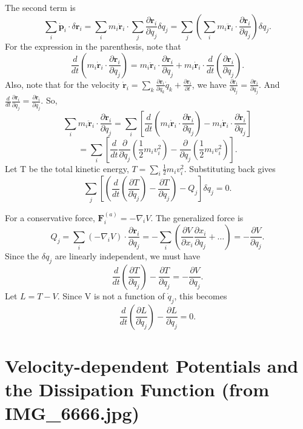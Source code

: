 \documentclass[12pt,a4paper]{article}
\theoremstyle{definition}
\theoremstyle{remark}
\renewcommand{\vec}[1]{\mathbf{#1}}
\begin{document}
	The second term is
	$$ \sum_i \dot{\vec{p}}_i \cdot \delta\vec{r}_i = \sum_i m_i \ddot{\vec{r}}_i \cdot \sum_j \frac{\partial \vec{r}_i}{\partial q_j} \delta q_j = \sum_j \left( \sum_i m_i \ddot{\vec{r}}_i \cdot \frac{\partial \vec{r}_i}{\partial q_j} \right) \delta q_j. $$
	For the expression in the parenthesis, note that
	$$ \frac{d}{dt} \left( m_i \dot{\vec{r}}_i \cdot \frac{\partial \vec{r}_i}{\partial q_j} \right) = m_i \ddot{\vec{r}}_i \cdot \frac{\partial \vec{r}_i}{\partial q_j} + m_i \dot{\vec{r}}_i \cdot \frac{d}{dt} \left( \frac{\partial \vec{r}_i}{\partial q_j} \right). $$
	Also, note that for the velocity $\dot{\vec{r}}_i = \sum_k \frac{\partial \vec{r}_i}{\partial q_k} \dot{q}_k + \frac{\partial \vec{r}_i}{\partial t}$, we have $\frac{\partial \dot{\vec{r}}_i}{\partial \dot{q}_j} = \frac{\partial \vec{r}_i}{\partial q_j}$. And $\frac{d}{dt} \frac{\partial \vec{r}_i}{\partial q_j} = \frac{\partial \dot{\vec{r}}_i}{\partial q_j}$.
	So,
	$$ \sum_i m_i \ddot{\vec{r}}_i \cdot \frac{\partial \vec{r}_i}{\partial q_j} = \sum_i \left[ \frac{d}{dt} \left( m_i \dot{\vec{r}}_i \cdot \frac{\partial \dot{\vec{r}}_i}{\partial \dot{q}_j} \right) - m_i \dot{\vec{r}}_i \cdot \frac{\partial \dot{\vec{r}}_i}{\partial q_j} \right] $$
	$$ = \sum_i \left[ \frac{d}{dt} \frac{\partial}{\partial \dot{q}_j} \left( \frac{1}{2} m_i v_i^2 \right) - \frac{\partial}{\partial q_j} \left( \frac{1}{2} m_i v_i^2 \right) \right]. $$
	Let T be the total kinetic energy, $T = \sum_i \frac{1}{2}m_i v_i^2$.
	Substituting back gives
	$$ \sum_j \left[ \left( \frac{d}{dt} \left( \frac{\partial T}{\partial \dot{q}_j} \right) - \frac{\partial T}{\partial q_j} \right) - Q_j \right] \delta q_j = 0. $$
	
	For a conservative force, $\vec{F}_i^{(a)} = -\nabla_i V$. The generalized force is
	$$ Q_j = \sum_i (-\nabla_i V) \cdot \frac{\partial \vec{r}_i}{\partial q_j} = -\sum_i \left( \frac{\partial V}{\partial x_i} \frac{\partial x_i}{\partial q_j} + \dots \right) = -\frac{\partial V}{\partial q_j}. $$
	Since the $\delta q_j$ are linearly independent, we must have
	$$ \frac{d}{dt} \left( \frac{\partial T}{\partial \dot{q}_j} \right) - \frac{\partial T}{\partial q_j} = -\frac{\partial V}{\partial q_j}. $$
	Let $L = T-V$. Since V is not a function of $\dot{q}_j$, this becomes
	$$ \frac{d}{dt}\left(\frac{\partial L}{\partial \dot{q}_j}\right) - \frac{\partial L}{\partial q_j} = 0. $$
	
	\section{Velocity-dependent Potentials and the Dissipation Function (from IMG\_6666.jpg)}
\end{document}
